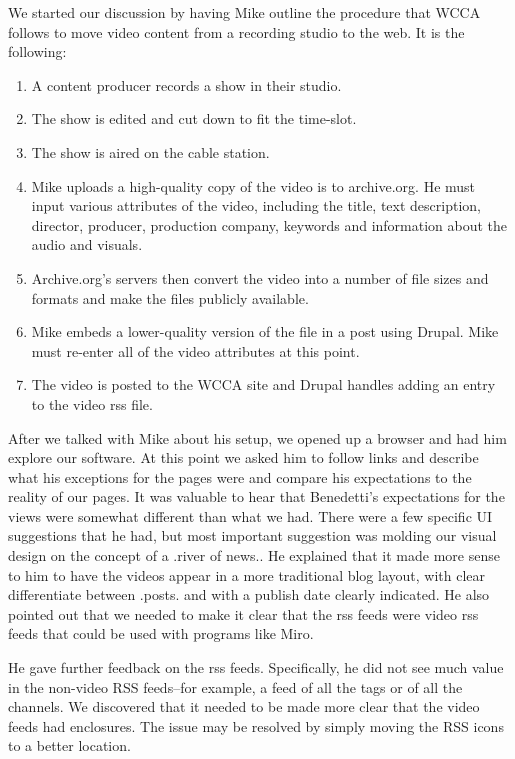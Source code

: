 \documentclass[a4paper,12pt]{report}
\begin{document}
We started our discussion by having Mike outline the procedure that WCCA follows to move video content from a recording 
studio to the web. 
It is the following: 

\begin{enumerate}
\item A content producer records a show in their studio. 
\item The show is edited and cut down to fit the time-slot.
\item The show is aired on the cable station. 
\item Mike uploads a high-quality copy of the video is to archive.org. He must input various attributes of the video, 
including the title, text description, director, producer, production company, keywords and information about the audio 
and visuals. 
\item Archive.org's servers then convert the video into a number of file sizes and formats and make the files publicly 
available.
\item Mike embeds a lower-quality version of the file in a post using Drupal. Mike must re-enter all of the video 
attributes at this point.
\item The video is posted to the WCCA site and Drupal handles adding an entry to the video rss file.
\end{enumerate}

After we talked with Mike about his setup, we opened up a browser and had him explore our software. At this point we 
asked him to follow links and describe what his exceptions for the pages were and compare his expectations to the 
reality of our pages. 
It was valuable to hear that Benedetti's expectations for the views were somewhat different than what we had. 
There were a few specific UI suggestions that he had, but most important suggestion was molding our visual design on the 
concept of a .river of news.. 
He explained that it made more sense to him to have the videos appear in a more traditional blog layout, with clear 
differentiate between .posts. and with a publish date clearly indicated. 
He also pointed out that we needed to make it clear that the rss feeds were video rss feeds that could be used with 
programs like Miro.

He gave further feedback on the rss feeds. 
Specifically, he did not see much value in the non-video RSS feeds--for example, a feed of all the tags or of all the 
channels. 
We discovered that it needed to be made more clear that the video feeds had enclosures. 
The issue may be resolved by simply moving the RSS icons to a better location.
\end{document}
